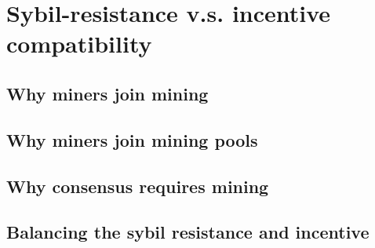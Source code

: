 \section{Sybil-resistance v.s. incentive compatibility}


\subsection{Why miners join mining}


\subsection{Why miners join mining pools}


\subsection{Why consensus requires mining}


\subsection{Balancing the sybil resistance and incentive}